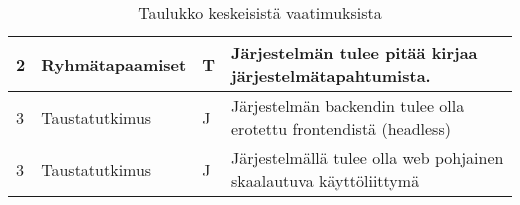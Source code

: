 \begin{landscape}
\begin{table}[]
{\begin{tabular}{llll}
    \multicolumn{1}{|l|}{2}                                            & \multicolumn{1}{l|}{Ryhmätapaamiset}                                      & \multicolumn{1}{l|}{T}                                    & \multicolumn{1}{l|}{Järjestelmän tulee pitää kirjaa järjestelmätapahtumista.}                               \\ \hline
    \multicolumn{1}{|l|}{3}                                            & \multicolumn{1}{l|}{Taustatutkimus}                                      & \multicolumn{1}{l|}{J}                                    & \multicolumn{1}{l|}{Järjestelmän backendin tulee olla erotettu frontendistä (headless)}                               \\ \hline
    \multicolumn{1}{|l|}{3}                                            & \multicolumn{1}{l|}{Taustatutkimus}                                      & \multicolumn{1}{l|}{J}                                    & \multicolumn{1}{l|}{Järjestelmällä tulee olla web pohjainen skaalautuva käyttöliittymä}                               \\ \hline
   

    \end{tabular}
}
    \caption{Taulukko keskeisistä vaatimuksista}
    \label{tab:vaatimukset}
    \end{table}	
\end{landscape}
